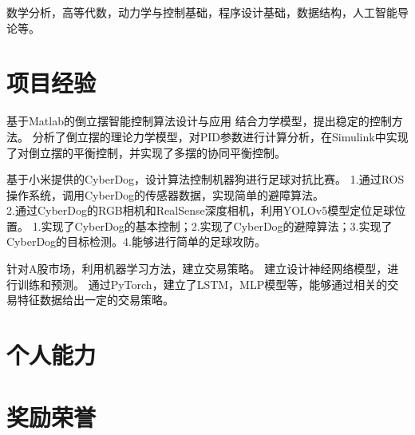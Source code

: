 \documentclass{resume}
\begin{document}
\qquad \qquad 数学分析，高等代数，动力学与控制基础，程序设计基础，数据结构，人工智能导论等。

\section{项目经验}
\Content
{基于Matlab的倒立摆智能控制算法设计与应用}
{结合力学模型，提出稳定的控制方法。}
{分析了倒立摆的理论力学模型，对PID参数进行计算分析，在Simulink中实现了对倒立摆的平衡控制，并实现了多摆的协同平衡控制。}

\Content
{基于小米提供的CyberDog，设计算法控制机器狗进行足球对抗比赛。}
{1.通过ROS操作系统，调用CyberDog的传感器数据，实现简单的避障算法。\\
2.通过CyberDog的RGB相机和RealSense深度相机，利用YOLOv5模型定位足球位置。}
{1.实现了CyberDog的基本控制；2.实现了CyberDog的避障算法；3.实现了CyberDog的目标检测。4.能够进行简单的足球攻防。}

\Content
{针对A股市场，利用机器学习方法，建立交易策略。}
{建立设计神经网络模型，进行训练和预测。}
{通过PyTorch，建立了LSTM，MLP模型等，能够通过相关的交易特征数据给出一定的交易策略。}

\section{个人能力}

\section{奖励荣誉}
\end{document}
